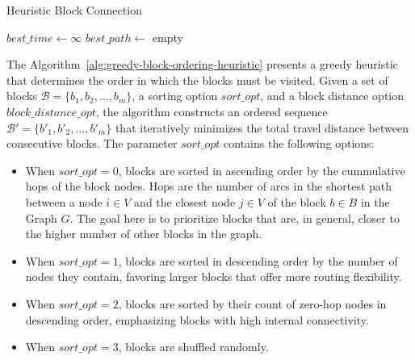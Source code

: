 \begin{algorithm}[h!]
	\caption{Heuristic Block Connection}\label{alg:heuristic-block-connection}
	\SetAlgoLined

	$best\_time \leftarrow \infty$\;
	$best\_path \leftarrow$ empty\;

	\;
\end{algorithm}

The Algorithm~\ref{alg:greedy-block-ordering-heuristic} presents a greedy heuristic that determines the order in which the blocks must be visited. Given a set of blocks $\mathcal{B} = \{b_1, b_2, \ldots, b_m\}$, a sorting option $sort\_opt$, and a block distance option $block\_distance\_opt$, the algorithm constructs an ordered sequence $\mathcal{B}' = \{b'_1, b'_2, \ldots, b'_m\}$ that iteratively minimizes the total travel distance between consecutive blocks. The parameter $sort\_opt$ contains the following options:

\begin{itemize}
	\item When $sort\_opt = 0$, blocks are sorted in ascending order by the cummulative hops of the block nodes. Hops are the number of arcs in the shortest path between a node $i \in V$ and the closest node $j \in V$ of the block $b \in B$ in the Graph $G$. The goal here is to prioritize blocks that are, in general, closer to the higher number of other blocks in the graph.
	\item When $sort\_opt = 1$, blocks are sorted in descending order by the number of nodes they contain, favoring larger blocks that offer more routing flexibility.
	\item When $sort\_opt = 2$, blocks are sorted by their count of zero-hop nodes in descending order, emphasizing blocks with high internal connectivity.
	\item When $sort\_opt = 3$, blocks are shuffled randomly.
\end{itemize}

